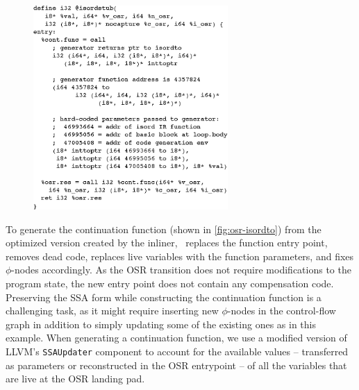 \ifdefined\noauthorea
\begin{figure}[ht]
\begin{center}
\includegraphics[width=0.66\textwidth]{figures/osr-isordstub/osr-isordstub.eps}
\caption{\protect}
\end{center}
\end{figure}
\fi

\noindent To generate the continuation function (shown in \myfigure\ref{fig:osr-isordto}) from the optimized version created by the inliner, \osrkit\ replaces the function entry point, removes dead code, replaces live variables with the function parameters, and fixes $\phi$-nodes accordingly. As the OSR transition does not require modifications to the program state, the new entry point does not contain any compensation code. Preserving the SSA form while constructing the continuation function is a challenging task, as it might require inserting new $\phi$-nodes in the control-flow graph in addition to simply updating some of the existing ones as in this example. When generating a continuation function, we use a modified version of LLVM's {\tt SSAUpdater} component to account for the available values -- transferred as parameters or reconstructed in the OSR entrypoint -- of all the variables that are live at the OSR landing pad.



